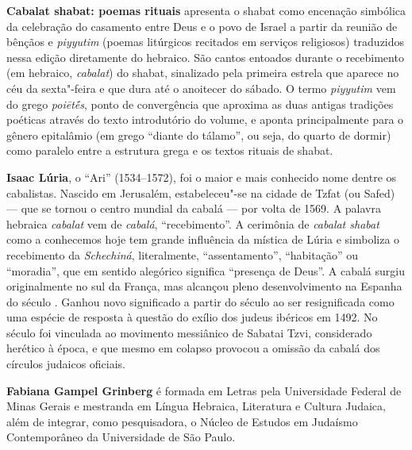 \textbf{Cabalat shabat: poemas rituais} apresenta o shabat como encenação simbólica da celebração do casamento entre Deus e o povo de Israel a partir da reunião de bênçãos e \emph{piyyutim} (poemas litúrgicos recitados em serviços religiosos) traduzidos nessa edição diretamente do hebraico. São cantos entoados durante o recebimento (em hebraico, \emph{cabalat}) do shabat, sinalizado pela primeira estrela que aparece no céu da sexta"-feira e que dura até o anoitecer do sábado. O termo \emph{piyyutim} vem do grego \emph{poiētḗs}, ponto de convergência que aproxima as duas antigas tradições poéticas através do texto introdutório do volume, e aponta principalmente para o gênero epitalâmio (em grego ``diante do tálamo'', ou seja, do quarto de dormir) como paralelo entre a estrutura grega e os textos rituais de shabat.

\textbf{Isaac Lúria}, o ``Ari'' (1534--1572), foi o maior e mais conhecido nome dentre os cabalistas. Nascido em Jerusalém, estabeleceu"-se na cidade de Tzfat (ou Safed) --- que se tornou o centro mundial da cabalá --- por volta de 1569. A palavra hebraica \emph{cabalat} vem de \emph{cabalá}, ``recebimento''. A cerimônia de \emph{cabalat shabat} como a conhecemos hoje tem grande influência da mística de Lúria e simboliza o recebimento da \emph{Schechiná}, literalmente, ``assentamento'', ``habitação'' ou ``moradia'', que em sentido alegórico significa ``presença de Deus''. A cabalá surgiu originalmente no sul da França, mas alcançou pleno desenvolvimento na Espanha do século . Ganhou novo significado a partir do século  ao ser resignificada como uma espécie de resposta à questão do exílio dos judeus ibéricos em 1492. No século  foi vinculada ao movimento messiânico de Sabatai Tzvi, considerado herético à época, e que mesmo em colapso provocou a omissão da cabalá dos círculos judaicos oficiais.

\textbf{Fabiana Gampel Grinberg} é formada em Letras pela Universidade Federal de Minas Gerais e mestranda em Língua Hebraica, Literatura e Cultura Judaica, além de integrar, como pesquisadora, o Núcleo de Estudos em Judaísmo Contemporâneo da Universidade de São Paulo.



